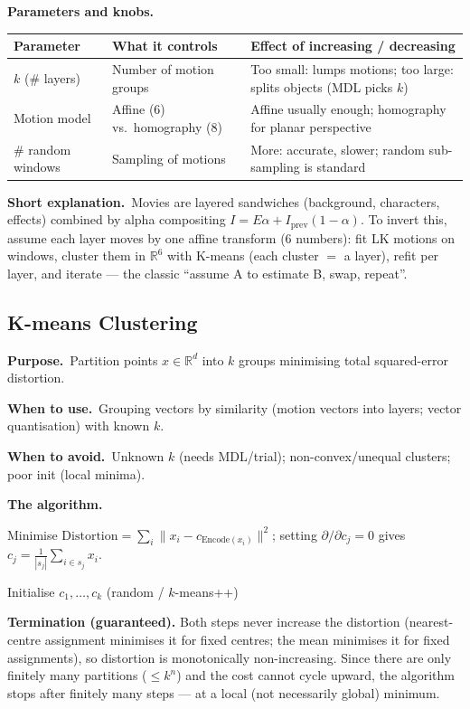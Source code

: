 \documentclass[10pt]{article}
\makeatletter
\newcommand{\Purpose}{\par\smallskip\textbf{Purpose.}\ }
\newcommand{\WhenUse}{\par\textbf{When to use.}\ }
\newcommand{\WhenAvoid}{\par\textbf{When to avoid.}\ }
\newcommand{\TheAlgo}{\par\smallskip\textbf{The algorithm.}\par\nopagebreak}
\newcommand{\Knobs}{\par\smallskip\textbf{Parameters and knobs.}\par\nopagebreak}
\newcommand{\ShortExp}{\par\smallskip\textbf{Short explanation.}\ }
\newcommand{\R}{\mathbb{R}}
\newenvironment{ptable}{\begin{center}\small\begin{tabular}{@{}p{2.5cm} p{5.9cm} p{6.2cm}@{}}\toprule
Parameter & What it controls & Effect of increasing / decreasing \\ \midrule}
{\bottomrule\end{tabular}\end{center}}
\makeatother
\begin{document}
\Knobs
\begin{ptable}
$k$ (\# layers) & Number of motion groups & Too small: lumps motions; too large: splits objects (MDL picks $k$) \\
Motion model & Affine (6) vs.\ homography (8) & Affine usually enough; homography for planar perspective \\
\# random windows & Sampling of motions & More: accurate, slower; random sub-sampling is standard \\
\end{ptable}
\ShortExp Movies are layered sandwiches (background, characters, effects) combined by alpha compositing
$I=E\alpha+I_{\text{prev}}(1-\alpha)$. To invert this, assume each layer moves by one affine transform (6
numbers): fit LK motions on windows, cluster them in $\R^6$ with K-means (each cluster $=$ a layer), refit
per layer, and iterate --- the classic ``assume A to estimate B, swap, repeat''.

\subsection{K-means Clustering}\label{sub:kmeans}
\Purpose Partition points $x\in\R^d$ into $k$ groups minimising total squared-error distortion.
\WhenUse Grouping vectors by similarity (motion vectors into layers; vector quantisation) with known $k$.
\WhenAvoid Unknown $k$ (needs MDL/trial); non-convex/unequal clusters; poor init (local minima).
\TheAlgo Minimise $\text{Distortion}=\sum_i\|x_i-c_{\text{Encode}(x_i)}\|^2$; setting
$\partial/\partial c_j=0$ gives $c_j=\frac{1}{|s_j|}\sum_{i\in s_j}x_i$.

\begin{algorithm}[H]
\SetAlgoLined
{}
Initialise $c_1,\dots,c_k$ (random / $k$-means++)\;
\caption{K-means (Lloyd)}
\end{algorithm}

\textbf{Termination (guaranteed).} Both steps never increase the distortion (nearest-centre assignment
minimises it for fixed centres; the mean minimises it for fixed assignments), so distortion is monotonically
non-increasing. Since there are only finitely many partitions ($\le k^n$) and the cost cannot cycle upward,
the algorithm stops after finitely many steps --- at a local (not necessarily global) minimum.
\end{document}
